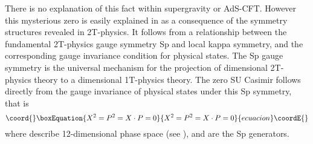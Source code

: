 \documentclass[a4paper,aps,preprint,nofootinbib]{revtex4}
\begin{document}
There is no explanation of this fact within supergravity or AdS-CFT. However
this mysterious zero is easily explained in \cite{AdS5S5} as a consequence
of the symmetry structures revealed in 2T-physics. It follows from a
relationship between the fundamental 2T-physics gauge symmetry Sp\myHighlight{$\left(
2\right) $}\coordHE{} and local kappa symmetry, and the corresponding gauge invariance
condition for physical states. The Sp\myHighlight{$\left( 2\right) $}\coordHE{} gauge symmetry is
the universal mechanism for the projection of \coordHE{} dimensional 2T-physics
theory to a \coordHE{} dimensional 1T-physics theory. The zero SU\coordHE{} Casimir follows directly from the gauge invariance of
physical states under this Sp\myHighlight{$\left( 2\right) $}\coordHE{} symmetry, that is
\begin{equation}\coord{}\boxEquation{
X^{2}=P^{2}=X\cdot P=0
}{
X^{2}=P^{2}=X\cdot P=0
}{ecuacion}\coordE{}\end{equation}%
where \coordHE{} describe 12-dimensional phase space (see \cite{survey2T}
), and \coordHE{} are the Sp\myHighlight{$\left( 2\right) $}\coordHE{} generators.
\end{document}
